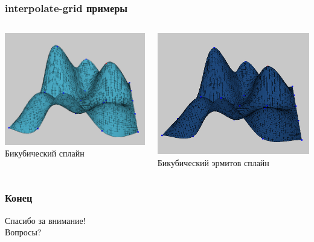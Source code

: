 \documentclass[rpussian]{beamer}
\begin{document}
\begin{frame}
  \frametitle{interpolate-grid примеры}
    \begin{columns}[c]
    \begin{column}{.5\textwidth}
      \begin{center}
        \includegraphics[width=\textwidth,keepaspectratio]{small_bicubic}
        \newline
        \scriptsize Бикубический сплайн
      \end{center}
    \end{column}
    \begin{column}{.5\textwidth}
      \begin{center}
      \includegraphics[width=\textwidth,keepaspectratio]{small_bicubic_hermite}
      \newline
      \scriptsize Бикубический эрмитов сплайн
      \end{center}
    \end{column}
  \end{columns}
\end{frame}

\begin{frame}
  \frametitle{Конец}
  \begin{center}
    Спасибо за внимание!
    \\ \vspace{1cm}
    Вопросы?
  \end{center}
\end{frame}
\end{document}
